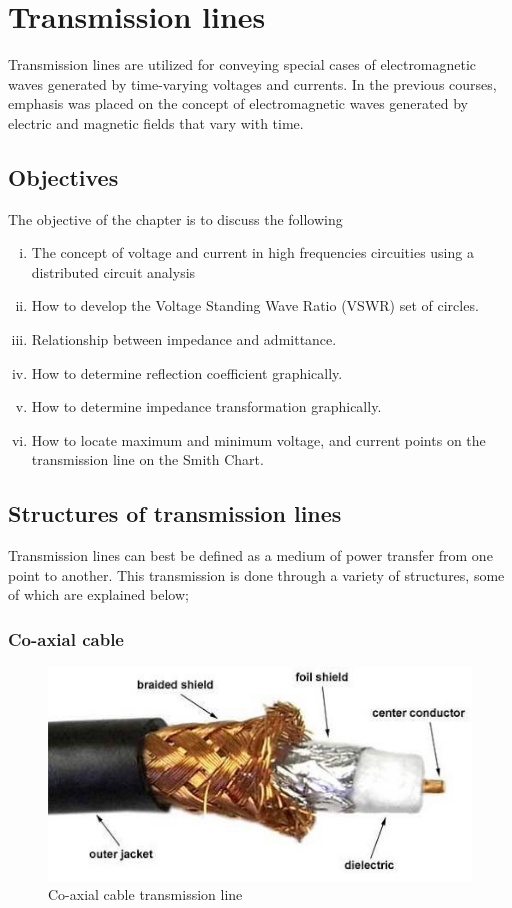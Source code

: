 \chapter{Transmission lines}\label{lec:lec2}
Transmission lines are utilized for conveying special cases of electromagnetic waves generated by time-varying voltages and currents. In the previous courses, emphasis was placed on the concept of electromagnetic waves generated by electric and magnetic fields that vary with time.

\section{Objectives}
The objective of the chapter is to discuss the following
\begin{enumerate}[(i)]
\item The concept of voltage and current in high frequencies circuities using a distributed circuit analysis
\item How to develop the Voltage Standing Wave Ratio (VSWR) set of circles.
\item Relationship between impedance and admittance.
\item How to determine reflection coefficient graphically.
\item How to determine impedance transformation graphically.
\item How to locate maximum and minimum voltage, and current points on the transmission line on the Smith Chart.
\end{enumerate}

\section{Structures of transmission lines}

Transmission lines can best be defined as a medium of power transfer from one point to another. This transmission is done through a variety of structures, some of which are explained below;

\subsection{Co-axial cable}
\begin{figure}[h]
\centering
\includegraphics[scale=0.65]{./graphics/coaxial}
\caption{Co-axial cable transmission line}
\label{fig:coaxial}
\end{figure}

